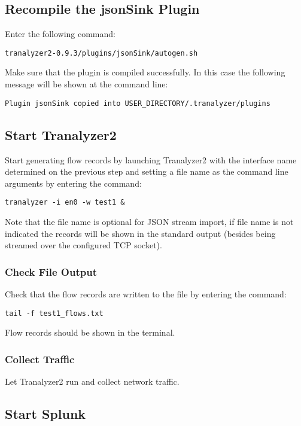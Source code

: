 \documentclass[documentation]{subfiles}
\begin{document}
\subsection{Recompile the jsonSink Plugin}

Enter the following command:
\begin{verbatim}
tranalyzer2-0.9.3/plugins/jsonSink/autogen.sh
\end{verbatim}
Make sure that the plugin is compiled successfully. In this case the
following message will be shown at the command line:
\begin{verbatim}
Plugin jsonSink copied into USER_DIRECTORY/.tranalyzer/plugins
\end{verbatim}

\subsection{Start Tranalyzer2}

Start generating flow records by launching Tranalyzer2 with the interface
name determined on the previous step and setting a file name as the
command line arguments by entering the command:
\begin{verbatim}
tranalyzer -i en0 -w test1 &
\end{verbatim}

Note that the file name is optional for JSON stream import, if file
name is not indicated the records will be shown in the standard output
(besides being streamed over the configured TCP socket).

\subsubsection{Check File Output}

Check that the flow records are written to the file by entering the
command:
\begin{verbatim}
tail -f test1_flows.txt
\end{verbatim}
Flow records should be shown in the terminal.

\subsubsection{Collect Traffic}

Let Tranalyzer2 run and collect network traffic.

\subsection{Start Splunk}
\end{document}
